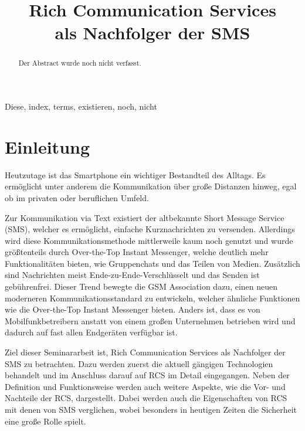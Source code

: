 \documentclass[conference]{IEEEtran}
\begin{document}
\title{Rich Communication Services\\als Nachfolger der SMS}

\author{
}

\maketitle

\begin{abstract}
    Der Abstract wurde noch nicht verfasst.
\end{abstract}

\begin{IEEEkeywords}
    Diese, index, terms, existieren, noch, nicht
\end{IEEEkeywords}

\section{Einleitung}
Heutzutage ist das Smartphone ein wichtiger Bestandteil des Alltags. Es ermöglicht unter anderem die Kommunikation über große Distanzen hinweg, egal ob im privaten oder beruflichen Umfeld.

Zur Kommunikation via Text existiert der altbekannte Short Message Service (SMS), welcher es ermöglicht, einfache Kurznachrichten zu versenden. Allerdings wird diese Kommunikationsmethode mittlerweile kaum noch genutzt und wurde größtenteils durch Over-the-Top Instant Messenger, welche deutlich mehr Funktionalitäten bieten, wie Gruppenchats und das Teilen von Medien. Zusätzlich sind Nachrichten meist Ende-zu-Ende-Verschlüsselt und das Senden ist gebührenfrei.
Dieser Trend bewegte die GSM Association dazu, einen neuen moderneren Kommunikationsstandard zu entwickeln, welcher ähnliche Funktionen wie die Over-the-Top Instant Messenger bieten. Anders ist, dass es von Mobilfunkbetreibern anstatt von einem großen Unternehmen betrieben wird und dadurch auf fast allen Endgeräten verfügbar ist.

Ziel dieser Seminararbeit ist, Rich Communication Services als Nachfolger der SMS zu betrachten. Dazu werden zuerst die aktuell gängigen Technologien behandelt und im Anschluss darauf auf RCS im Detail eingegangen. Neben der Definition und Funktionsweise werden auch weitere Aspekte, wie die Vor- und Nachteile der RCS, dargestellt. Dabei werden auch die Eigenschaften von RCS mit denen von SMS verglichen, wobei besonders in heutigen Zeiten die Sicherheit eine große Rolle spielt.
\end{document}
